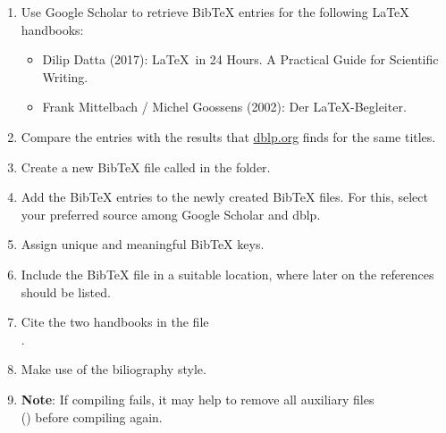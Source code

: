\begin{enumerate}
  \item Use Google Scholar to retrieve Bib\TeX{} entries for the following \LaTeX{}
  handbooks:
  \begin{itemize}
    \item Dilip Datta (2017): \LaTeX\ in 24 Hours. A Practical Guide for Scientific Writing.
    \item Frank Mittelbach / Michel Goossens (2002): Der \LaTeX-Begleiter.
  \end{itemize}
  \item Compare the entries with the results that \url{dblp.org} finds for the same titles.
  \item Create a new Bib\TeX{} file called  in the  folder.
  \item Add the Bib\TeX{} entries to the newly created Bib\TeX{} files. For this, select your preferred source among Google Scholar and dblp.
  \item Assign unique and meaningful Bib\TeX{} keys.
  \item Include the Bib\TeX{} file in a suitable location, where later on the references should be listed.
  \item Cite the two handbooks in the 
  file\\.
  \item Make use of the  biliography style.
  \item \textbf{Note}: If compiling fails, it may help to remove all auxiliary 
  files \\() before compiling again.
\end{enumerate}

